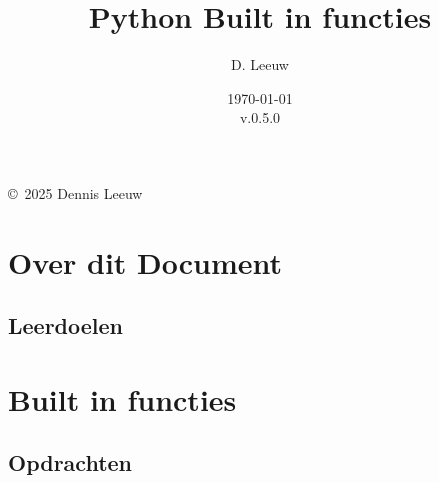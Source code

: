 \documentclass[a4paper,12pt,twoside,openright,titlepage]{book}
\author{D. Leeuw}
\title{Python Built in functies}
\date{\today\\v.0.5.0}
\begin{document}

\maketitle

\copyright\ 2025 Dennis Leeuw\\




\frontmatter
\chapter{Over dit Document}
\section{Leerdoelen}


\tableofcontents

\mainmatter

\chapter{Built in functies}

%
\section{Opdrachten}


\printindex
\end{document}
